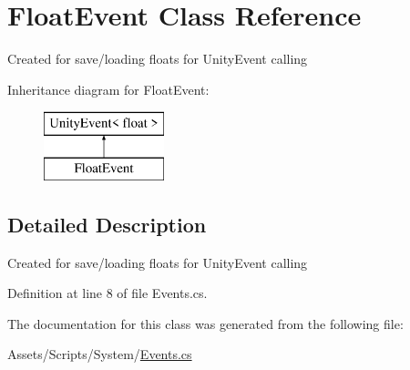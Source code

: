 \hypertarget{class_float_event}{}\section{Float\+Event Class Reference}
\label{class_float_event}


Created for save/loading floats for Unity\+Event calling  


Inheritance diagram for Float\+Event\+:\begin{figure}[H]
\begin{center}
\leavevmode
\includegraphics[height=2.000000cm]{class_float_event}
\end{center}
\end{figure}


\subsection{Detailed Description}
Created for save/loading floats for Unity\+Event calling 



Definition at line 8 of file Events.\+cs.



The documentation for this class was generated from the following file\+:\begin{DoxyCompactItemize}
\item 
Assets/\+Scripts/\+System/\mbox{\hyperlink{_events_8cs}{Events.\+cs}}\end{DoxyCompactItemize}

